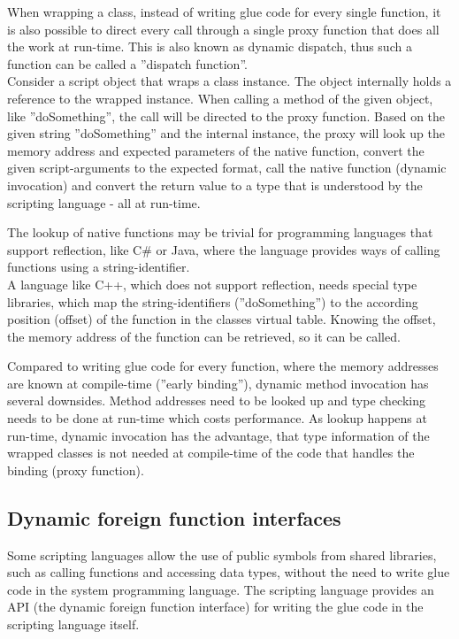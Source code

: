 When wrapping a class, instead of writing glue code for every single function, it is also possible to direct every call through a single proxy function that does all the work at run-time. This is also known as dynamic dispatch, thus such a function can be called a ''dispatch function''. \\

Consider a script object that wraps a class instance. The object internally holds a reference to the wrapped instance. When calling a method of the given object, like ''doSomething'', the call will be directed to the proxy function. Based on the given string ''doSomething'' and the internal instance, the proxy will look up the memory address and expected parameters of the native function, convert the given script-arguments to the expected format, call the native function (dynamic invocation) and convert the return value to a type that is understood by the scripting language - all at run-time.

The lookup of native functions may be trivial for programming languages that support reflection, like C\# or Java, where the language provides ways of calling functions using a string-identifier.\\
A language like C++, which does not support reflection, needs special type libraries, which map the string-identifiers (''doSomething'') to the according position (offset) of the function in the classes virtual table. Knowing the offset, the memory address of the function can be retrieved, so it can be called.

Compared to writing glue code for every function, where the memory addresses are known at compile-time (''early binding''), dynamic method invocation has several downsides. Method addresses need to be looked up and type checking needs to be done at run-time which costs performance. As lookup happens at run-time, dynamic invocation has the advantage, that type information of the wrapped classes is not needed at compile-time of the code that handles the binding (proxy function).

\subsection{Dynamic foreign function interfaces}

Some scripting languages allow the use of public symbols from shared libraries, such as calling functions and accessing data types, without the need to write glue code in the system programming language. The scripting language provides an API (the dynamic foreign function interface) for writing the glue code in the scripting language itself.

